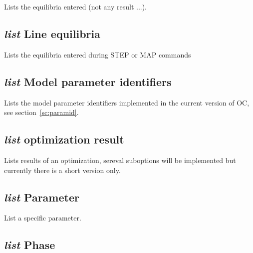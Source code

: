 \documentclass[12pt]{article}
\begin{document}
Lists the equilibria entered (not any result ...).

\subsection{{\em list} Line equilibria}

Lists the equilibria entered during STEP or MAP commands

\subsection{{\em list} Model parameter identifiers}

Lists the model parameter identifiers implemented in the current
version of OC, see section~\ref{sc:paramid}.

\subsection{{\em list} optimization result}

Lists results of an optimization, sereval suboptions will be
implemented but currently there is a short version only.

\subsection{{\em list} Parameter}

List a specific parameter.

\subsection{{\em list} Phase}
\end{document}
